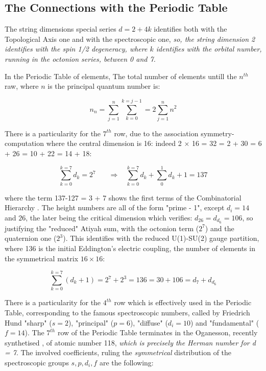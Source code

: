 \documentclass[a4paper,9pt]{article}
\newcounter{row}
\begin{document}
 
\subsection{The Connections with the Periodic Table}

The string dimensions special series $d= 2+4k$ identifies both with the Topological Axis one and with the spectroscopic one, \textit {so, the string dimension 2 identifies with the spin 1/2 degeneracy, where $k$ identifies with the orbital number, running in the octonion series, between 0 and 7.} 

In the Periodic Table of elements, The total number of elements untill the $n^{th}$ raw, where $n$ is the principal quantum number is:

\begin{equation}\label{Eq46}
n_n = \sum _{j=1}^{n}  \sum_{k=0}^{k=j-1} = 2 \sum _{j=1}^{n} n^2
 \end{equation}

There is a particularity for the $7^{th}$ row, due to the association symmetry-computation where the central dimension is 16: indeed 2 $\times$ 16 = 32 = 2 + 30 = 6 + 26 = 10 + 22 = 14 + 18:  

\begin{equation}\label{Eq47}
 \sum_{k=0}^{k=7} d_k = 2^7~~~~~~~~\Rightarrow~~~~  \sum_{k=0}^{k=7} d_k + \sum_0^1{d_k + 1} = 137
 \end{equation}

 where the term 137-127 = 3 + 7 shows the first terms of the Combinatorial Hierarchy \cite{Bastin}. The height numbers are all of the form "prime - 1", except $d_i = 14$ and $26$, the later being the critical dimension which verifies: $ d_{26} = d_{d_6} = 106 $, so justifying the "reduced" Atiyah sum, with the octonion term ($2^7$) and the quaternion one ($2^3$). This identifies with the reduced U(1)-SU(2) gauge partition, where 136 is the initial Eddington's electric coupling, the number of elements in the symmetrical matrix $16\times16$: 

\begin{equation}\label{Eq48}
 \sum_{k=0}^{k=7} (d_k+1)= 2^7 + 2^3 = 136 = 30 + 106 = d_7 + d_{d_6}
 \end{equation}
  

There is a particularity for the $4^{th}$ row which is effectively used in the Periodic Table, corresponding to the famous spectroscopic numbers, called by Friedrich Hund "sharp" ($s = 2$), "principal" ($p = 6$), "diffuse" ($d_i = 10$) and "fundamental" ($f = 14$). The $7^{th}$ row of the Periodic Table terminates in the Oganesson, recently synthetised \cite{Oganessian}, of atomic number 118, \textit{which is precisely the Herman number for d = 7}. The involved coefficients, ruling the \textit{symmetrical} distribution of the spectroscopic groups $s,p,d_i,f$ are the following:
\end{document}
